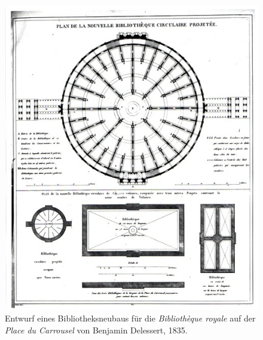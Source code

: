 \begin{figure}[htbp]
\centering
\includegraphics{img/wagner-11.jpg}
\caption{Entwurf eines Bibliotheksneubaus für die
\emph{Bibliothèque royale} auf der \emph{Place du Carrousel} von
Benjamin Delessert, 1835.}
\end{figure}

